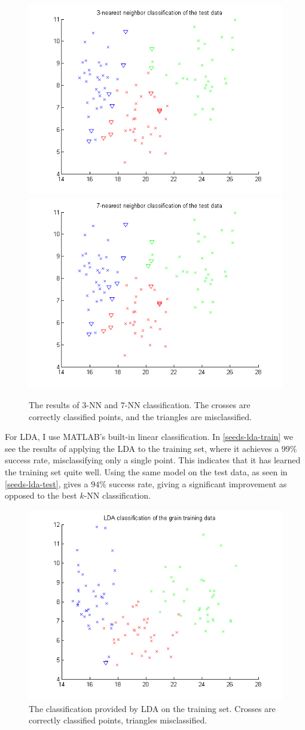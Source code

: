 \documentclass[11pt,a4paper]{article}
\begin{document}
\begin{figure}[h!]
    \centering
    \includegraphics[width=.45\textwidth]{images/seeds-3nn-success}
    \includegraphics[width=.45\textwidth]{images/seeds-7nn-success}
    \caption{The results of $3$-NN and $7$-NN classification. The crosses are
             correctly classified points, and the triangles are misclassified.}
    \label{seeds-knn-success}
\end{figure}

For LDA, I use MATLAB's built-in linear classification. In
\autoref{seeds-lda-train} we see the results of applying the LDA to the
training set, where it achieves a $99\%$ success rate, misclassifying only a
single point. This indicates that it has learned the training set quite well.
Using the same model on the test data, as seen in \autoref{seeds-lda-test},
gives a $94\%$ success rate, giving a significant improvement as opposed to
the best $k$-NN classification.

\begin{figure}[h!]
    \centering
    \includegraphics[width=.75\textwidth]{images/seeds-lda-train}
    \caption{The classification provided by LDA on the training set. Crosses are correctly classified points, triangles misclassified.}
    \label{seeds-lda-train}
\end{figure}
\end{document}
